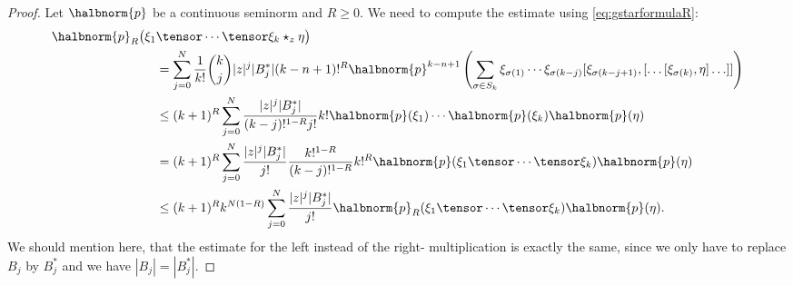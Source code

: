 \documentclass[
11pt,                          %
english                        %
]{article}
\begin{document}
\begin{proof}
	Let $\halbnorm{p}$ be a continuous seminorm and $R \geq 0$. We need to
	compute the estimate using \eqref{eq:gstarformulaR}:
	\begin{align*}
		\halbnorm{p}_R
		\big(
			\xi_1
		&	
			 \tensor \cdots \tensor \xi_k \star_z \eta
		\big)
		\\
		&=
	    \sum\limits_{j=0}^N
        \frac{1}{k!} \binom{k}{j}
        |z|^j |B_j^*|
        (k - n + 1)!^R
        \halbnorm{p}^{k - n + 1}
        \left(
            \sum\limits_{\sigma \in S_k}
            \xi_{\sigma(1)} \cdots \xi_{\sigma(k - j)}
            [\xi_{\sigma(k - j + 1)},
            [ \ldots [\xi_{\sigma(k)}, \eta] \ldots ]
            ]
        \right)
        \\
        & \leq
        (k + 1)^R
	    \sum\limits_{j=0}^N
        \frac{|z|^j |B_j^*|}{(k-j)!^{1-R} j!}
        k! 
        \halbnorm{p}(\xi_1) \cdots \halbnorm{p}(\xi_k)
        \halbnorm{p}(\eta)
        \\
        & =
        (k + 1)^R
	    \sum\limits_{j=0}^N
        \frac{|z|^j |B_j^*|}{j!}
        \frac{k!^{1 - R}}{(k-j)!^{1-R}}
        k!^R
        \halbnorm{p}(\xi_1 \tensor \cdots \tensor \xi_k)
        \halbnorm{p}(\eta)
        \\
        & \leq
        (k + 1)^R
        k^{N (1-R)}
	    \sum\limits_{j=0}^N
        \frac{|z|^j |B_j^*|}{j!}
        \halbnorm{p}_R(\xi_1 \tensor \cdots \tensor \xi_k)
        \halbnorm{p}(\eta).
	\end{align*}
	We should mention here, that the estimate for the left instead of the right-
	multiplication is exactly the same, since we only have to replace $B_j$ by 
	$B_j^*$ and we have $|B_j| = |B_j^*|$.
	

\end{proof}
\end{document}

